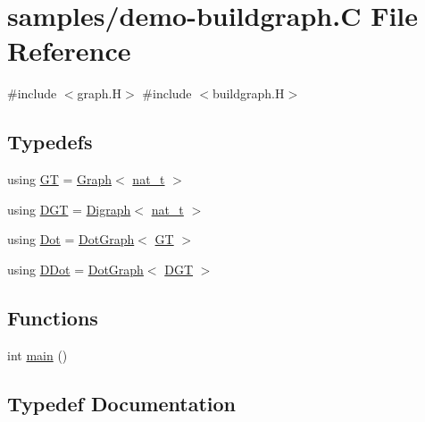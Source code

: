 \hypertarget{demo-buildgraph_8_c}{}\section{samples/demo-\/buildgraph.C File Reference}
\label{demo-buildgraph_8_c}
{\ttfamily \#include $<$graph.\+H$>$}\newline
{\ttfamily \#include $<$buildgraph.\+H$>$}\newline
\subsection*{Typedefs}
\begin{DoxyCompactItemize}
\item 
using \hyperlink{demo-buildgraph_8_c_a3001c40d2c31ca87ed96cd7d1334a55e}{GT} = \hyperlink{class_designar_1_1_graph}{Graph}$<$ \hyperlink{namespace_designar_aa72662848b9f4815e7bf31a7cf3e33d1}{nat\+\_\+t} $>$
\item 
using \hyperlink{demo-buildgraph_8_c_ae73e956c2a8cf0a58255aa6b659985e0}{D\+GT} = \hyperlink{class_designar_1_1_digraph}{Digraph}$<$ \hyperlink{namespace_designar_aa72662848b9f4815e7bf31a7cf3e33d1}{nat\+\_\+t} $>$
\item 
using \hyperlink{demo-buildgraph_8_c_a70657b0b48a4d69ef850be3c5517ecc2}{Dot} = \hyperlink{class_designar_1_1_dot_graph}{Dot\+Graph}$<$ \hyperlink{demo-buildgraph_8_c_a3001c40d2c31ca87ed96cd7d1334a55e}{GT} $>$
\item 
using \hyperlink{demo-buildgraph_8_c_a0ffdd103a7285712ccbd9548ff5544e7}{D\+Dot} = \hyperlink{class_designar_1_1_dot_graph}{Dot\+Graph}$<$ \hyperlink{demo-buildgraph_8_c_ae73e956c2a8cf0a58255aa6b659985e0}{D\+GT} $>$
\end{DoxyCompactItemize}
\subsection*{Functions}
\begin{DoxyCompactItemize}
\item 
int \hyperlink{demo-buildgraph_8_c_ae66f6b31b5ad750f1fe042a706a4e3d4}{main} ()
\end{DoxyCompactItemize}


\subsection{Typedef Documentation}
\mbox{\label{demo-buildgraph_8_c_a0ffdd103a7285712ccbd9548ff5544e7}} 
